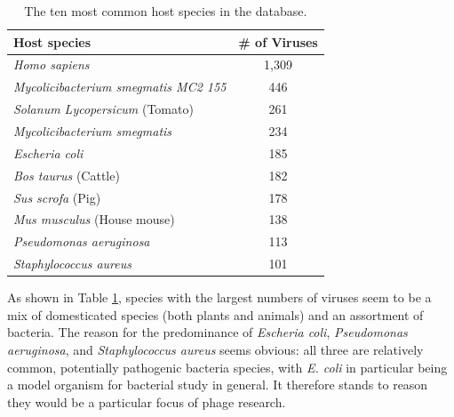 \documentclass[12pt]{article}
\begin{document}
    \begin{table}[H]
        \begin{center}
            \begin{tabular}{|l||c|}
                \hline
                Host species                                 & \# of Viruses \\ \hline\hline
                \textit{Homo sapiens}                        & 1,309         \\ \hline
                \textit{Mycolicibacterium smegmatis MC2 155} & 446           \\ \hline
                \textit{Solanum Lycopersicum} (Tomato)       & 261           \\ \hline
                \textit{Mycolicibacterium smegmatis}         & 234           \\ \hline
                \textit{Escheria coli}                       & 185           \\ \hline
                \textit{Bos taurus} (Cattle)                 & 182           \\ \hline
                \textit{Sus scrofa} (Pig)                    & 178           \\ \hline
                \textit{Mus musculus} (House mouse)          & 138           \\ \hline
                \textit{Pseudomonas aeruginosa}              & 113           \\ \hline
                \textit{Staphylococcus aureus}               & 101           \\ \hline    
            \end{tabular}
            \caption{The ten most common host species in the database.}
            \label{most_common_hosts_table}
        \end{center}
    \end{table}

    As shown in Table \ref{most_common_hosts_table}, species with the largest
    numbers of viruses seem to be a mix of domesticated species (both plants
    and animals) and an assortment of bacteria. The reason for the predominance of
    \emph{Escheria coli}, \emph{Pseudomonas aeruginosa}, and \emph{Staphylococcus
    aureus} seems obvious: all three are relatively common, potentially pathogenic
    bacteria species, with \emph{E. coli} in particular being a model organism for
    bacterial study in general. It therefore stands to reason they would be a
    particular focus of phage research.
\end{document}
